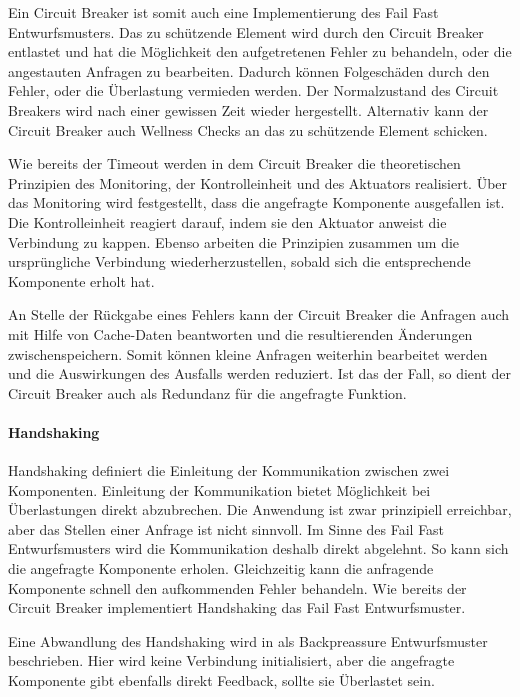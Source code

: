 \documentclass[]{lni}
\begin{document}
Ein Circuit Breaker ist somit auch eine Implementierung des Fail Fast Entwurfsmusters.
Das zu schützende Element wird durch den Circuit Breaker entlastet und hat die Möglichkeit den aufgetretenen Fehler zu behandeln, oder die angestauten Anfragen zu bearbeiten. 
Dadurch können Folgeschäden durch den Fehler, oder die Überlastung vermieden werden. 
Der Normalzustand des Circuit Breakers wird nach einer gewissen Zeit wieder hergestellt.
Alternativ kann der Circuit Breaker auch Wellness Checks an das zu schützende Element schicken.

Wie bereits der Timeout werden in dem Circuit Breaker die theoretischen Prinzipien des Monitoring, der Kontrolleinheit und des Aktuators realisiert.
Über das Monitoring wird festgestellt, dass die angefragte Komponente ausgefallen ist.
Die Kontrolleinheit reagiert darauf, indem sie den Aktuator anweist die Verbindung zu kappen.
Ebenso arbeiten die Prinzipien zusammen um die ursprüngliche Verbindung wiederherzustellen, sobald sich die entsprechende Komponente erholt hat.

An Stelle der Rückgabe eines Fehlers kann der Circuit Breaker die Anfragen auch mit Hilfe von Cache-Daten beantworten und die resultierenden Änderungen zwischenspeichern. 
Somit können kleine Anfragen weiterhin bearbeitet werden und die Auswirkungen des Ausfalls werden reduziert.
Ist das der Fall, so dient der Circuit Breaker auch als Redundanz für die angefragte Funktion.

\paragraph{Handshaking}
Handshaking definiert die Einleitung der Kommunikation zwischen zwei Komponenten.
Einleitung der Kommunikation bietet Möglichkeit bei Überlastungen direkt abzubrechen. 
Die Anwendung ist zwar prinzipiell erreichbar, aber das Stellen einer Anfrage ist nicht sinnvoll.
Im Sinne des Fail Fast Entwurfsmusters wird die Kommunikation deshalb direkt abgelehnt.
So kann sich die angefragte Komponente erholen.
Gleichzeitig kann die anfragende Komponente schnell den aufkommenden Fehler behandeln.
Wie bereits der Circuit Breaker implementiert Handshaking das Fail Fast Entwurfsmuster.

Eine Abwandlung des Handshaking wird in \cite{PriyankGupta.10Jun2021} als Backpreassure Entwurfsmuster beschrieben.
Hier wird keine Verbindung initialisiert, aber die angefragte Komponente gibt ebenfalls direkt Feedback, sollte sie Überlastet sein.
\end{document}
